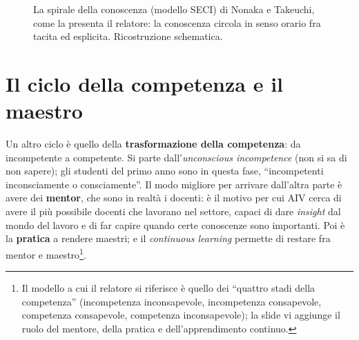 \begin{figure}[htbp]
\centering
{}
\caption{La spirale della conoscenza (modello SECI) di Nonaka e Takeuchi,
come la presenta il relatore: la conoscenza circola in senso orario fra
tacita ed esplicita. Ricostruzione schematica.}
\label{p0:fig:seci}
\end{figure}

\section{Il ciclo della competenza e il maestro}
\label{p0:sec:competenza}

Un altro ciclo è quello della \textbf{trasformazione della competenza}: da
incompetente a competente. Si parte dall'\emph{unconscious incompetence}
(non si sa di non sapere); gli studenti del primo anno sono in questa fase,
``incompetenti inconsciamente o consciamente''. Il modo migliore per
arrivare dall'altra parte è avere dei \textbf{mentor}, che sono in realtà i
docenti: è il motivo per cui AIV cerca di avere il più possibile docenti
che lavorano nel settore, capaci di dare \emph{insight} dal mondo del lavoro
e di far capire quando certe conoscenze sono importanti. Poi è la
\textbf{pratica} a rendere maestri; e il \emph{continuous learning} permette
di restare fra mentor e maestro\footnote{Il modello a cui il relatore si
riferisce è quello dei ``quattro stadi della competenza''
(incompetenza inconsapevole, incompetenza consapevole, competenza
consapevole, competenza inconsapevole); la slide vi aggiunge il ruolo del
mentore, della pratica e dell'apprendimento continuo.}.

